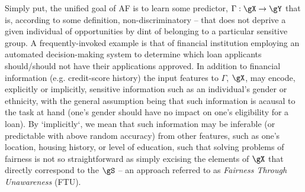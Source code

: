 %

Simply put, the unified goal of \ac{AF} is to learn some predictor, \(\Gamma: \gX \to \gY \) that
is, according to some definition, non-discriminatory -- that does not deprive a given individual of
opportunities by dint of belonging to a particular sensitive group.
%
A frequently-invoked example is that of financial institution employing an automated
decision-making system to determine which loan applicants should/should not have their applications
approved.
%
In addition to financial information (e.g. credit-score history) the input features to \(\Gamma\),
\(\gX\), may encode, explicitly or implicitly, sensitive information such as an individual's gender
or ethnicity, with the general assumption being that such information is acausal to the task at
hand (one's gender should have no impact on one's eligibility for a loan).
%
By `implicitly`, we mean that such information may be inferable (or predictable with above random
accuracy) from other features, such as one's location, housing history, or level of education, such
that solving problems of fairness is not so straightforward as simply excising the elements of
\(\gX\) that directly correspond to the \(\gS\) -- an approach referred to as \emph{Fairness
Through Unawareness} (FTU).
%

